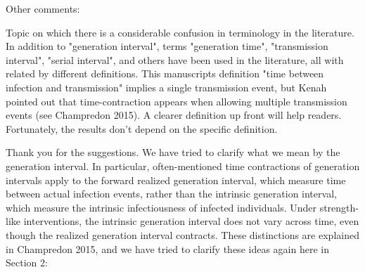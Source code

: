 \documentclass[12pt]{article}
\newcommand{\revtext}{\textsf}
\begin{document}
\revtext{Other comments:}

\revtext{Topic on which there is a considerable confusion in terminology in the literature.  In addition to "generation interval", terms "generation time", "transmission interval", "serial interval", and others have been used in the literature, all with related by different definitions.  This manuscripts definition "time between infection and transmission" implies a single transmission event, but Kenah pointed out that time-contraction appears when allowing multiple transmission events (see Champredon 2015).  A clearer definition up front will help readers.  Fortunately, the results don't depend on the specific definition.}

Thank you for the suggestions. We have tried to clarify what we mean by the generation interval. In particular, often-mentioned time contractions of generation intervals apply to the forward realized generation interval, which measure time between actual infection events, rather than the intrinsic generation interval, which measure the intrinsic infectiousness of infected individuals. Under strength-like interventions, the intrinsic generation interval does not vary across time, even though the realized generation interval contracts. These distinctions are explained in Champredon 2015, and we have tried to clarify these ideas again here in Section 2:
\end{document}
